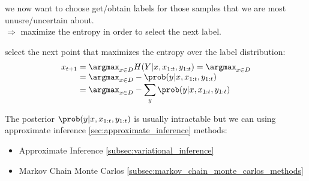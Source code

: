 \begin{sectionbox}\nospacing
  we now want to choose get/obtain labels for those samples that we are most unusre/uncertain about.\\
  $\Rightarrow$ maximize the entropy in order to select the next label.
\end{sectionbox}
\begin{defnbox}\nospacing
  \begin{defn}
    select the next point that maximizes the entropy over the label distribution:
    \begin{align}
          x_{t+1}&=\argmax_{x\in D}H(Y|x,x_{1:t},y_{1:t})=\argmax_{x\in D}\\[-1\jot]
                 &=\argmax_{x\in D}-\prob(y|x,x_{1:t},y_{1:t})\\[-1\jot]
                 &=\argmax_{x\in D}-\sum_{y}\prob(y|x,x_{1:t},y_{1:t})
    \end{align}
  \end{defn}
\end{defnbox}
\begin{notebox}[Notes]\nospacing
  The posterior $\prob(y|x,x_{1:t},y_{1:t})$ is usually intractable but we can using approximate inference \cref{sec:approximate_inference} methods:
  \begin{itemize}
    \item Approximate Inference \cref{subsec:variational_inference}
    \item Markov Chain Monte Carlos \cref{subsec:markov_chain_monte_carlos_methods}
  \end{itemize}
\end{notebox}

